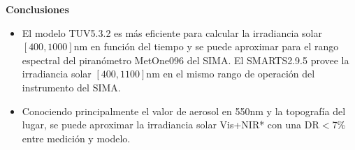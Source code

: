 \begin{shaded}
    \centering
    \textbf{\textcolor{ver}{Conclusiones}}
\end{shaded}
\begin{itemize}
    \item El modelo TUV5.3.2 es más eficiente para calcular la irradiancia solar $\left[400,1000\right]$nm en función del tiempo y se puede aproximar para el rango espectral del piranómetro MetOne096 del SIMA. El SMARTS2.9.5 provee la irradiancia solar $\left[400,1100\right]$nm en el mismo rango de operación del instrumento del SIMA.
    \item Conociendo principalmente el valor de aerosol en 550nm y la topografía del lugar, se puede aproximar la irradiancia solar Vis+NIR* con una DR$<$7\% entre medición y modelo.
\end{itemize}
